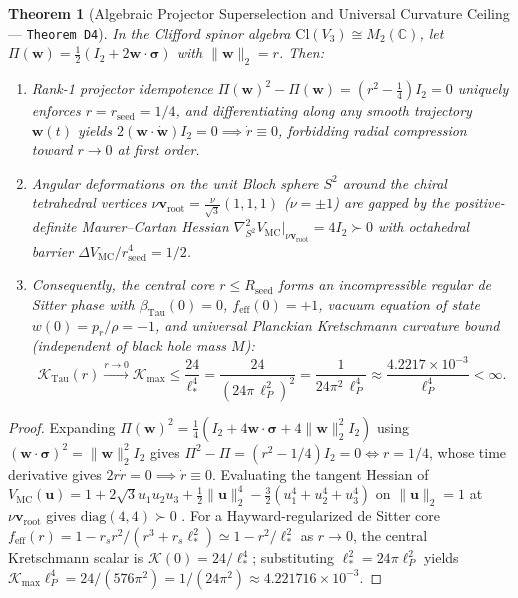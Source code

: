 \documentclass[11pt,a4paper]{article}
\newtheorem{theorem}{Theorem}[section]
\theoremstyle{remark}
\begin{document}
\begin{theorem}[Algebraic Projector Superselection and Universal Curvature Ceiling --- \texttt{Theorem D4}]
\label{thm:d4}
In the Clifford spinor algebra $\mathrm{Cl}(V_3) \cong M_2(\mathbb{C})$, let $\Pi(\mathbf{w}) = \frac{1}{2}(I_2 + 2\mathbf{w}\cdot\boldsymbol{\sigma})$ with $\|\mathbf{w}\|_2 = r$. Then:
\begin{enumerate}
  \item Rank-1 projector idempotence $\Pi(\mathbf{w})^2 - \Pi(\mathbf{w}) = (r^2 - \frac{1}{4})I_2 = 0$ uniquely enforces $r = r_{\mathrm{seed}} = 1/4$, and differentiating along any smooth trajectory $\mathbf{w}(t)$ yields $2(\mathbf{w}\cdot\dot{\mathbf{w}})I_2 = 0 \implies \dot{r} \equiv 0$, forbidding radial compression toward $r \to 0$ at first order.
  \item Angular deformations on the unit Bloch sphere $S^2$ around the chiral tetrahedral vertices $\nu\mathbf{v}_{\mathrm{root}} = \frac{\nu}{\sqrt{3}}(1,1,1)$ ($\nu = \pm 1$) are gapped by the positive-definite Maurer--Cartan Hessian $\nabla^2_{S^2} V_{\mathrm{MC}}\big|_{\nu\mathbf{v}_{\mathrm{root}}} = 4I_2 \succ 0$ with octahedral barrier $\Delta V_{\mathrm{MC}}/r_{\mathrm{seed}}^4 = 1/2$.
  \item Consequently, the central core $r \le R_{\mathrm{seed}}$ forms an incompressible regular de Sitter phase with $\beta_{\mathrm{Tau}}(0) = 0$, $f_{\mathrm{eff}}(0) = +1$, vacuum equation of state $w(0) = p_r/\rho = -1$, and universal Planckian Kretschmann curvature bound (independent of black hole mass $M$):
  \begin{equation}
    \mathcal{K}_{\mathrm{Tau}}(r) \xrightarrow{r \to 0} \mathcal{K}_{\max} \le \frac{24}{\ell_*^4} = \frac{24}{(24\pi\,\ell_P^2)^2} = \frac{1}{24\pi^2\,\ell_P^4} \approx \frac{4.2217 \times 10^{-3}}{\ell_P^4} < \infty.
    \label{eq:kretschmann_bound}
  \end{equation}
\end{enumerate}
\end{theorem}

\begin{proof}
Expanding $\Pi(\mathbf{w})^2 = \frac{1}{4}(I_2 + 4\mathbf{w}\cdot\boldsymbol{\sigma} + 4\|\mathbf{w}\|_2^2 I_2)$ using $(\mathbf{w}\cdot\boldsymbol{\sigma})^2 = \|\mathbf{w}\|_2^2 I_2$ gives $\Pi^2 - \Pi = (r^2 - 1/4)I_2 = 0 \iff r = 1/4$, whose time derivative gives $2r\dot{r} = 0 \implies \dot{r} \equiv 0$. Evaluating the tangent Hessian of $V_{\mathrm{MC}}(\mathbf{u}) = 1 + 2\sqrt{3}u_1 u_2 u_3 + \frac{1}{2}\|\mathbf{u}\|_2^4 - \frac{3}{2}(u_1^4+u_2^4+u_3^4)$ on $\|\mathbf{u}\|_2 = 1$ at $\nu\mathbf{v}_{\mathrm{root}}$ gives $\mathrm{diag}(4, 4) \succ 0$ \cite{JolcsakTauFoundationSeries2026}. For a Hayward-regularized de Sitter core $f_{\mathrm{eff}}(r) = 1 - r_s r^2/(r^3 + r_s \ell_*^2) \simeq 1 - r^2/\ell_*^2$ as $r \to 0$, the central Kretschmann scalar is $\mathcal{K}(0) = 24/\ell_*^4$; substituting $\ell_*^2 = 24\pi\ell_P^2$ yields $\mathcal{K}_{\max}\ell_P^4 = 24/(576\pi^2) = 1/(24\pi^2) \approx 4.221716 \times 10^{-3}$.
\end{proof}
\end{document}
